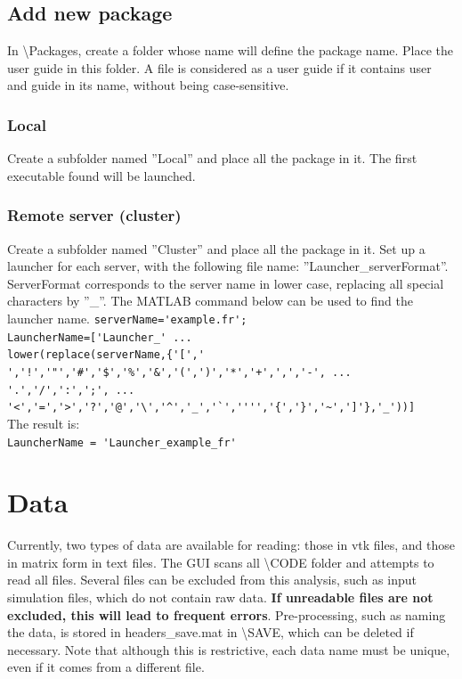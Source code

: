 \documentclass{article}
\begin{document}
\subsection{Add new package}

In \textbackslash Packages, create a folder whose name will define the package name. Place the user guide in this folder.  A file is considered as a user guide if it contains user and guide in its name, without being case-sensitive.

\subsubsection{Local}

Create a subfolder named ''Local'' and place all the package in it. The first executable found will be launched.

\subsubsection{Remote server (cluster)}

Create a subfolder named ''Cluster'' and place all the package in it. Set up a launcher for each server, with the following file name: ''Launcher\_serverFormat''. ServerFormat corresponds to the server name in lower case, replacing all special characters by ''\_''. The MATLAB command below can be used to find the launcher name.
\newline\newline
\verb|serverName='example.fr';|\\
\verb|LauncherName=['Launcher_' ...|\\
\verb|lower(replace(serverName,{'[',' ','!','"','#','$','%','&','(',')','*','+',',','-', ...|\\
\verb|'.','/',':',';', ...|\\
\verb|'<','=','>','?','@','\','^','_','`','''','{','}','~',']'},'_'))]|\\
\newline
The result is:\\
\verb|LauncherName = 'Launcher_example_fr'|

\section{Data}

Currently, two types of data are available for reading: those in vtk files, and those in matrix form in text files. The GUI scans all \textbackslash CODE folder and attempts to read all files. Several files can be excluded from this analysis, such as input simulation files, which do not contain raw data. \textbf{If unreadable files are not excluded, this will lead to frequent errors}. Pre-processing, such as naming the data, is stored in headers\_save.mat in \textbackslash SAVE, which can be deleted if necessary. Note that although this is restrictive, each data name must be unique, even if it comes from a different file.
\end{document}
